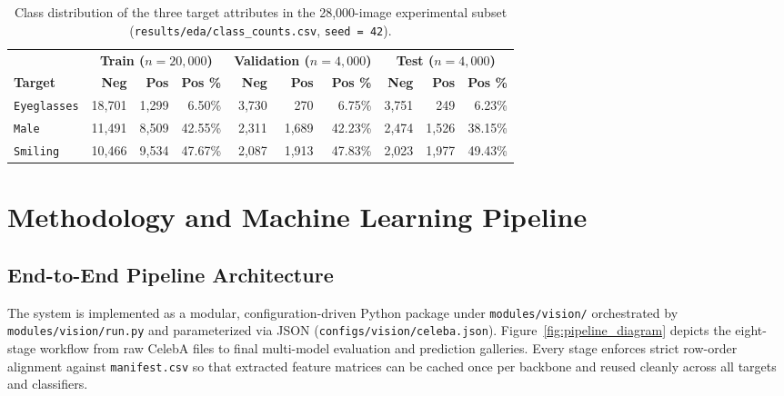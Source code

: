 \documentclass[12pt,a4paper]{article}
\newcommand{\code}[1]{\texttt{#1}}
\begin{document}
\begin{table}[H]
  \centering
  \caption[Target class distribution in the 28,000-image subset]{Class distribution of the three target attributes in the 28,000-image experimental subset (\code{results/\allowbreak{}eda/\allowbreak{}class\_\allowbreak{}counts.csv}, \code{seed = 42}).}
  \label{tab:subset_counts}
  \small
  \begin{tabular}{@{}l r r r r r r r r r@{}}
    \toprule
    & \multicolumn{3}{c}{\textbf{Train ($n = 20{,}000$)}} & \multicolumn{3}{c}{\textbf{Validation ($n = 4{,}000$)}} & \multicolumn{3}{c}{\textbf{Test ($n = 4{,}000$)}} \\
    \cmidrule(lr){2-4} \cmidrule(lr){5-7} \cmidrule(lr){8-10}
    \textbf{Target} & \textbf{Neg} & \textbf{Pos} & \textbf{Pos \%} & \textbf{Neg} & \textbf{Pos} & \textbf{Pos \%} & \textbf{Neg} & \textbf{Pos} & \textbf{Pos \%} \\
    \midrule
    \code{Eyeglasses} & 18,701 & 1,299 & 6.50\%  & 3,730 & 270   & 6.75\%  & 3,751 & 249   & 6.23\% \\
    \code{Male}       & 11,491 & 8,509 & 42.55\% & 2,311 & 1,689 & 42.23\% & 2,474 & 1,526 & 38.15\% \\
    \code{Smiling}    & 10,466 & 9,534 & 47.67\% & 2,087 & 1,913 & 47.83\% & 2,023 & 1,977 & 49.43\% \\
    \bottomrule
  \end{tabular}
\end{table}

\section{Methodology and Machine Learning Pipeline}
\label{sec:methodology}

\subsection{End-to-End Pipeline Architecture}
\label{subsec:pipeline_arch}

The system is implemented as a modular, configuration-driven Python package under \code{modules/\allowbreak{}vision/\allowbreak{}} orchestrated by \code{modules/\allowbreak{}vision/\allowbreak{}run.py} and parameterized via JSON (\code{configs/\allowbreak{}vision/\allowbreak{}celeba.json}). Figure~\ref{fig:pipeline_diagram} depicts the eight-stage workflow from raw CelebA files to final multi-model evaluation and prediction galleries. Every stage enforces strict row-order alignment against \code{manifest.csv} so that extracted feature matrices can be cached once per backbone and reused cleanly across all targets and classifiers.
\end{document}
